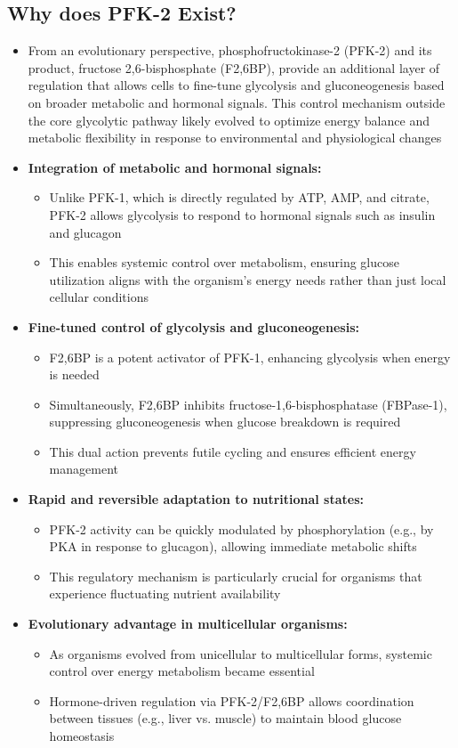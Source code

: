 \documentclass[10pt]{article}
\begin{document}
\subsection*{Why does PFK-2 Exist?}
\begin{itemize}
	\item From an evolutionary perspective, phosphofructokinase-2 (PFK-2) and its product, fructose 2,6-bisphosphate (F2,6BP), provide an additional layer of regulation that allows cells to fine-tune glycolysis and gluconeogenesis based on broader metabolic and hormonal signals. This control mechanism outside the core glycolytic pathway likely evolved to optimize energy balance and metabolic flexibility in response to environmental and physiological changes 
	\item \textbf{Integration of metabolic and hormonal signals:}
	\begin{itemize}
        \item Unlike PFK-1, which is directly regulated by ATP, AMP, and citrate, PFK-2 allows glycolysis to respond to hormonal signals such as insulin and glucagon
        \item This enables systemic control over metabolism, ensuring glucose utilization aligns with the organism's energy needs rather than just local cellular conditions
    \end{itemize}
	\item \textbf{Fine-tuned control of glycolysis and gluconeogenesis:}
	\begin{itemize}
        \item F2,6BP is a potent activator of PFK-1, enhancing glycolysis when energy is needed
        \item Simultaneously, F2,6BP inhibits fructose-1,6-bisphosphatase (FBPase-1), suppressing gluconeogenesis when glucose breakdown is required
        \item This dual action prevents futile cycling and ensures efficient energy management
    \end{itemize}
	\item \textbf{Rapid and reversible adaptation to nutritional states:}
	\begin{itemize}
        \item PFK-2 activity can be quickly modulated by phosphorylation (e.g., by PKA in response to glucagon), allowing immediate metabolic shifts
        \item This regulatory mechanism is particularly crucial for organisms that experience fluctuating nutrient availability
    \end{itemize}
	\item \textbf{Evolutionary advantage in multicellular organisms:}
	\begin{itemize}
        \item As organisms evolved from unicellular to multicellular forms, systemic control over energy metabolism became essential
        \item Hormone-driven regulation via PFK-2/F2,6BP allows coordination between tissues (e.g., liver vs. muscle) to maintain blood glucose homeostasis
    \end{itemize}
\end{itemize}
\end{document}
